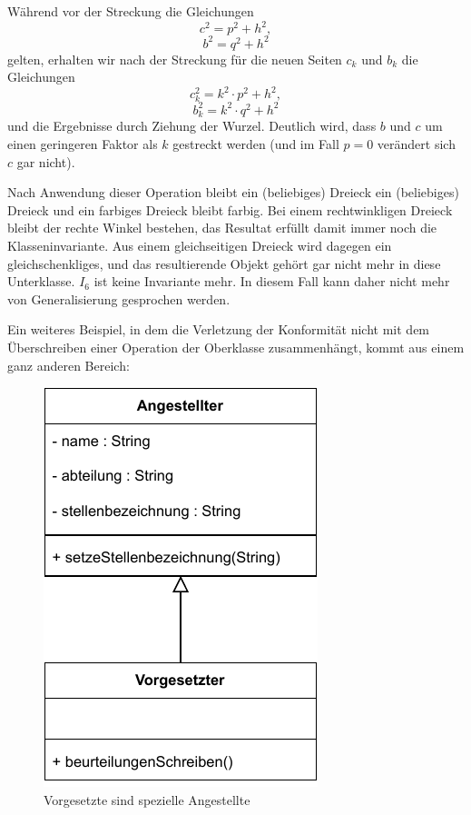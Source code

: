 Während vor der Streckung die Gleichungen 
$$c^2 = p^2 + h^2,$$
$$b^2 = q^2 + h^2$$
gelten, erhalten wir nach der Streckung für die neuen Seiten
$c_k$ und $b_k$ die Gleichungen 
$$ c_k^2 = k^2 \cdot p^2 + h^2,$$ 
$$ b_k^2 = k^2 \cdot q^2 + h^2$$
und die Ergebnisse durch Ziehung der Wurzel. Deutlich wird, dass $b$ und $c$ um einen geringeren Faktor als $k$ gestreckt werden (und im Fall $p=0$ verändert sich $c$ gar nicht).

Nach Anwendung dieser Operation bleibt ein (beliebiges) Dreieck ein (beliebiges) Dreieck und ein farbiges Dreieck bleibt farbig. Bei einem rechtwinkligen Dreieck bleibt der rechte Winkel bestehen, das Resultat erfüllt damit immer noch die Klassen\-invariante. Aus einem gleichseitigen Dreieck wird dagegen ein gleichschenkliges, und das resultierende Objekt gehört gar nicht mehr in diese Unterklasse. $I_6$ ist keine Invariante mehr. In diesem Fall kann daher nicht mehr von Generalisierung gesprochen werden.

Ein weiteres Beispiel, in dem die Verletzung der Konformität nicht mit dem Überschreiben einer Operation der Oberklasse zusammenhängt, kommt aus einem ganz anderen Bereich:

\begin{figure}[h!]
	\centering
	\includegraphics{Bilder/Kapitel-9/angestellter_vorgesetzter.pdf}
	\caption{Vorgesetzte sind spezielle Angestellte}
	\label{fig:angestellter_vorgesetzter.pdf}
\end{figure}

